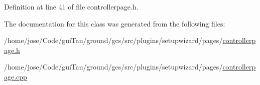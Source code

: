 Definition at line 41 of file controllerpage.\-h.



The documentation for this class was generated from the following files\-:\begin{DoxyCompactItemize}
\item 
/home/jose/\-Code/gui\-Tau/ground/gcs/src/plugins/setupwizard/pages/\hyperlink{controllerpage_8h}{controllerpage.\-h}\item 
/home/jose/\-Code/gui\-Tau/ground/gcs/src/plugins/setupwizard/pages/\hyperlink{controllerpage_8cpp}{controllerpage.\-cpp}\end{DoxyCompactItemize}

